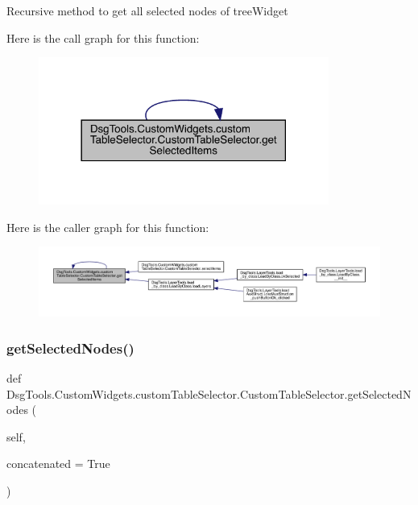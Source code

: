\begin{DoxyVerb}Recursive method to get all selected nodes of treeWidget
\end{DoxyVerb}
 Here is the call graph for this function\+:
\nopagebreak
\begin{figure}[H]
\begin{center}
\leavevmode
\includegraphics[width=270pt]{class_dsg_tools_1_1_custom_widgets_1_1custom_table_selector_1_1_custom_table_selector_ad9f3c101290cad906f084c6568afedf5_cgraph}
\end{center}
\end{figure}
Here is the caller graph for this function\+:
\nopagebreak
\begin{figure}[H]
\begin{center}
\leavevmode
\includegraphics[width=350pt]{class_dsg_tools_1_1_custom_widgets_1_1custom_table_selector_1_1_custom_table_selector_ad9f3c101290cad906f084c6568afedf5_icgraph}
\end{center}
\end{figure}
\mbox{\label{class_dsg_tools_1_1_custom_widgets_1_1custom_table_selector_1_1_custom_table_selector_af47b3d8d56cf04c461fa9811ede42645}} 
\subsubsection{\texorpdfstring{get\+Selected\+Nodes()}{getSelectedNodes()}}
{\footnotesize\ttfamily def Dsg\+Tools.\+Custom\+Widgets.\+custom\+Table\+Selector.\+Custom\+Table\+Selector.\+get\+Selected\+Nodes (\begin{DoxyParamCaption}\item[{}]{self,  }\item[{}]{concatenated = {\ttfamily True} }\end{DoxyParamCaption})}

